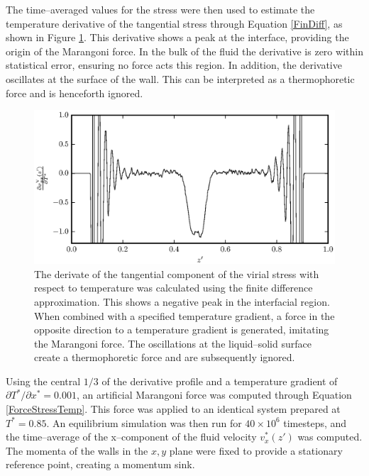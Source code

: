 The time--averaged values for the stress were then used to estimate the temperature derivative of the tangential stress through Equation \ref{FinDiff}, as shown in Figure \ref{PisVirForce}.
This derivative shows a peak at the interface, providing the origin of the Marangoni force.
In the bulk of the fluid the derivative is zero within statistical error, ensuring no force acts this region.
In addition, the derivative oscillates at the surface of the wall.
This can be interpreted as a thermophoretic force and is henceforth ignored.

\begin{figure}[h!]
\centering
\includegraphics[scale=1.0]{PisVirForce}
\caption{The derivate of the tangential component of the virial stress with respect to temperature was calculated using the finite difference approximation.
This shows a negative peak in the interfacial region.
When combined with a specified temperature gradient, a force in the opposite direction to a temperature gradient is generated, imitating the Marangoni force.
The oscillations at the liquid--solid surface create a thermophoretic force and are subsequently ignored.}
\label{PisVirForce}
\end{figure}
\FloatBarrier

Using the central $1/3$ of the derivative profile and a temperature gradient of $\partial T^{*} / \partial x^{*} = 0.001$, an artificial Marangoni force was computed through Equation \ref{ForceStressTemp}.
This force was applied to an identical system prepared at $T^{*} = 0.85$.
An equilibrium simulation was then run for $40 \times 10^{6}$ timesteps, and the time--average of the x--component of the fluid velocity $v^{*}_{x}(z')$ was computed.
The momenta of the walls in the $x,y$ plane were fixed to provide a stationary reference point, creating a momentum sink.

